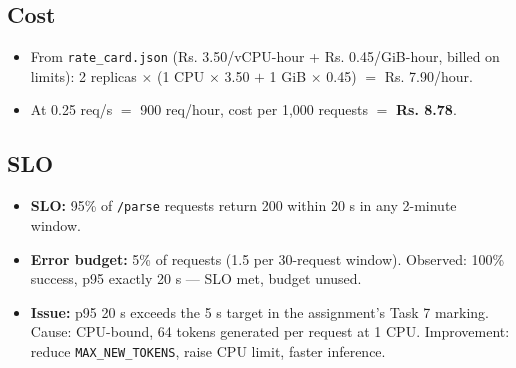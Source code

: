 \documentclass[11pt,a4paper]{article}
\begin{document}
\subsection*{Cost}
\begin{itemize}
\item From \texttt{rate\_card.json} (Rs. 3.50/vCPU-hour + Rs. 0.45/GiB-hour, billed on limits): 2 replicas $\times$ (1 CPU $\times$ 3.50 $+$ 1 GiB $\times$ 0.45) $=$ Rs. 7.90/hour.
\item At 0.25 req/s $=$ 900 req/hour, cost per 1,000 requests $=$ \textbf{Rs. 8.78}.
\end{itemize}
\subsection*{SLO}
\begin{itemize}
\item \textbf{SLO:} 95\% of \texttt{/parse} requests return 200 within 20 s in any 2-minute window.
\item \textbf{Error budget:} 5\% of requests (1.5 per 30-request window). Observed: 100\% success, p95 exactly 20 s --- SLO met, budget unused.
\item \textbf{Issue:} p95 20 s exceeds the 5 s target in the assignment's Task 7 marking. Cause: CPU-bound, 64 tokens generated per request at 1 CPU. Improvement: reduce \texttt{MAX\_NEW\_TOKENS}, raise CPU limit, faster inference.
\end{itemize}
\end{document}
